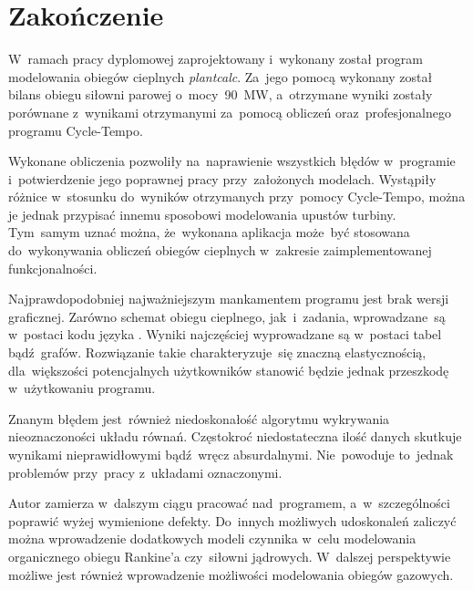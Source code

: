 \section{Zakończenie}

W~ramach pracy dyplomowej zaprojektowany i~wykonany został program
modelowania obiegów cieplnych \textit{plantcalc}. Za~jego pomocą
wykonany został bilans obiegu siłowni parowej
o~mocy~\SI{90}{\mega\watt}, a~otrzymane wyniki zostały porównane
z~wynikami otrzymanymi za~pomocą obliczeń oraz~profesjonalnego programu
Cycle-Tempo.

Wykonane obliczenia pozwoliły na~naprawienie wszystkich błędów
w~programie i~potwierdzenie jego poprawnej pracy przy~założonych
modelach. Wystąpiły różnice w~stosunku do~wyników otrzymanych
przy~pomocy Cycle-Tempo, można je jednak przypisać innemu sposobowi
modelowania upustów turbiny. Tym~samym uznać można, że~wykonana
aplikacja może~być stosowana do~wykonywania obliczeń obiegów cieplnych
w~zakresie zaimplementowanej funkcjonalności.

Najprawdopodobniej najważniejszym mankamentem programu jest brak wersji
graficznej. Zarówno schemat obiegu cieplnego, jak~i~zadania,
wprowadzane~są w~postaci kodu języka \Cpp. Wyniki najczęściej
wyprowadzane są w~postaci tabel bądź~grafów. Rozwiązanie takie
charakteryzuje~się znaczną elastycznością, dla~większości potencjalnych
użytkowników stanowić będzie jednak przeszkodę w~użytkowaniu programu.

Znanym błędem jest~również niedoskonałość algorytmu wykrywania
nieoznaczoności układu równań. Częstokroć niedostateczna ilość danych
skutkuje wynikami nieprawidłowymi bądź~wręcz absurdalnymi. Nie~powoduje
to~jednak problemów przy~pracy z~układami oznaczonymi.

Autor zamierza w~dalszym ciągu pracować nad~programem, a~w~szczególności
poprawić wyżej wymienione defekty. Do~innych możliwych udoskonaleń
zaliczyć można wprowadzenie dodatkowych modeli czynnika w~celu
modelowania organicznego obiegu Rankine'a czy~siłowni jądrowych.
W~dalszej perspektywie możliwe jest również wprowadzenie możliwości
modelowania obiegów gazowych.

